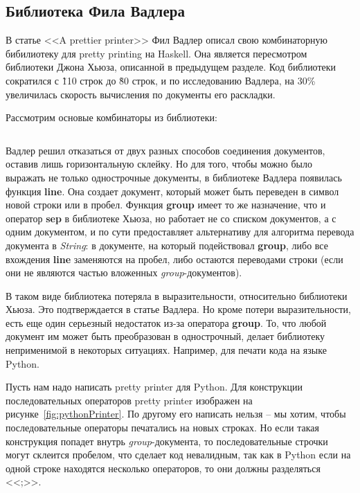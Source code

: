 \newpage

\subsection{Библиотека Фила Вадлера}

В статье <<A prettier printer>>\cite{wadler} Фил Вадлер описал свою комбинаторную бибилиотеку для pretty printing на Haskell. Она является пересмотром библиотеки Джона Хьюза, описанной в предыдущем разделе. Код библиотеки сократился с \~110 строк до \~80 строк, и по исследованию Вадлера, на 30\% увеличилась скорость вычисления по документы его раскладки.

Рассмотрим основые комбинаторы из библиотеки:
\inputminted{haskell}{codes/wadlerBasicOperations.hs}

Вадлер решил отказаться от двух разных способов соединения документов, оставив лишь горизонтальную склейку. Но для того, чтобы можно было выражать не только однострочные документы, в библиотеке Вадлера появилась функция \textbf{line}. Она создает документ, который может быть переведен в символ новой строки или в пробел.
Функция \textbf{group} имеет то же назначение, что и оператор \textbf{sep} в библиотеке Хьюза, но работает не со списком документов, а с одним документом, и по сути предоставляет альтернативу для алгоритма перевода документа в \textit{String}: в документе, на который подействовал \textbf{group}, либо все вхождения \textbf{line} заменяются на пробел, либо остаются переводами строки (если они не являются частью вложенных \textit{group}-документов).

В таком виде библиотека потеряла в выразительности, относительно библиотеки Хьюза. Это подтверждается в статье Вадлера. Но кроме потери выразительности, есть еще один серьезный недостаток из-за оператора \textbf{group}. То, что любой документ им может быть преобразован в однострочный, делает библиотеку неприменимой в некоторых ситуациях. Например, для печати кода на языке Python.

Пусть нам надо написать pretty printer для Python. Для конструкции последовательных операторов pretty printer изображен на рисунке~\ref{fig:pythonPrinter}.
По другому его написать нельзя -- мы хотим, чтобы последовательные операторы печатались на новых строках. Но если такая конструкция попадет внутрь \textit{group}-документа, то последовательные строчки могут склеится пробелом, что сделает код невалидным, так как в Python если на одной строке находятся несколько операторов, то они должны разделяться <<;>>.

